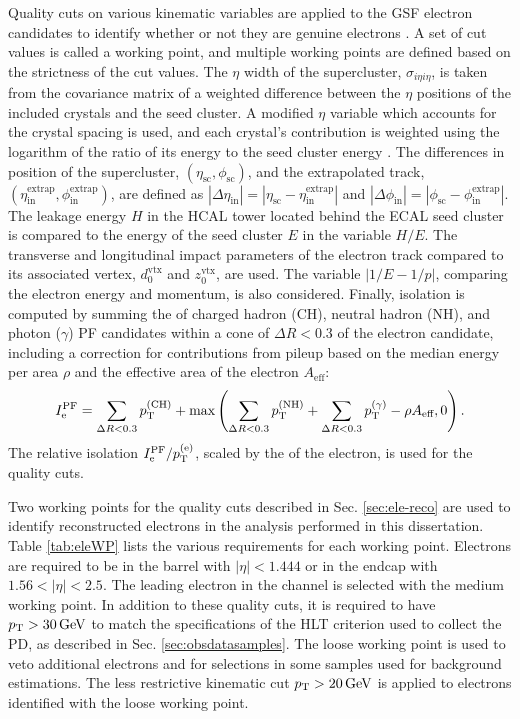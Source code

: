 Quality cuts on various kinematic variables are applied to the GSF electron candidates to identify whether or not they are genuine electrons \cite{ElectronCutBased}. A set of cut values is called a working point, and multiple working points are defined based on the strictness of the cut values. The $\eta$ width of the supercluster, $\sigma_{i\eta i\eta}$, is taken from the covariance matrix of a weighted difference between the $\eta$ positions of the included crystals and the seed cluster. A modified $\eta$ variable which accounts for the crystal spacing is used, and each crystal's contribution is weighted using the logarithm of the ratio of its energy to the seed cluster energy \cite{EgammaShowerShape}. The differences in position of the supercluster, $(\eta_{\text{sc}},\phi_{\text{sc}})$, and the extrapolated track, $(\eta_{\text{in}}^{\text{extrap}},\phi_{\text{in}}^{\text{extrap}})$, are defined as $|\Delta \eta_{\text{in}}| = |\eta_{\text{sc}} - \eta_{\text{in}}^{\text{extrap}}|$ and $|\Delta \phi_{\text{in}}| = |\phi_{\text{sc}} - \phi_{\text{in}}^{\text{extrap}}|$. The leakage energy $H$ in the HCAL tower located behind the ECAL seed cluster is compared to the energy of the seed cluster $E$ in the variable $H/E$. The transverse and longitudinal impact parameters of the electron track compared to its associated vertex, $d_{0}^{\text{vtx}}$ and $z_{0}^{\text{vtx}}$, are used. The variable $|1/E - 1/p|$, comparing the electron energy and momentum, is also considered. Finally, isolation is computed by summing the \pt of charged hadron (CH), neutral hadron (NH), and photon ($\gamma$) PF candidates within a cone of $\Delta R < 0.3$ of the electron candidate, including a correction for contributions from pileup based on the median energy per area $\rho$ and the effective area of the electron $A_{\text{eff}}$:
\begin{equation}
I^{\text{PF}}_{\mathrm{e}} = \sum_{\Delta R < 0.3}{p_{\mathrm{T}}^{(\text{CH})}} + \text{max}\left( \sum_{\Delta R < 0.3}{p_{\mathrm{T}}^{(\text{NH})}} + \sum_{\Delta R < 0.3}{p_{\mathrm{T}}^{(\gamma)}} - \rho A_{\text{eff}}, 0 \right).
\end{equation}
The relative isolation $I^{\text{PF}}_{\mathrm{e}}/p_{\mathrm{T}}^{(\mathrm{e})}$, scaled by the \pt of the electron, is used for the quality cuts.

Two working points for the quality cuts described in Sec. \ref{sec:ele-reco} are used to identify reconstructed electrons in the analysis performed in this dissertation. Table \ref{tab:eleWP} lists the various requirements for each working point. Electrons are required to be in the barrel with $|\eta|<1.444$ or in the endcap with $1.56<|\eta|<2.5$. The leading electron in the \etau channel is selected with the medium working point. In addition to these quality cuts, it is required to have $p_{\mathrm{T}}>30\,\text{Ge\hspace{-.08em}V}$ to match the specifications of the HLT criterion used to collect the PD, as described in Sec. \ref{sec:obsdatasamples}. The loose working point is used to veto additional electrons and for selections in some samples used for background estimations. The less restrictive kinematic cut $p_{\mathrm{T}}>20\,\text{Ge\hspace{-.08em}V}$ is applied to electrons identified with the loose working point.

